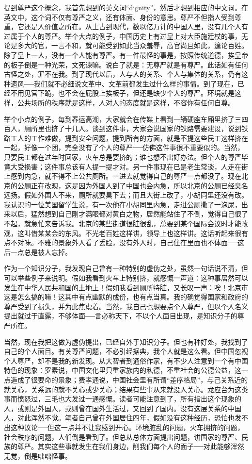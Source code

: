 提到尊严这个概念，我首先想到的英文词“dignity”，然后才想到相应的中文词。在英文中，这个词不仅有尊严之义，还有体面、身份的意思。尊严不但指人受到尊重，它还是人价值之所在。从上古到现代，数以亿万计的中国人里，没有几个人有过属于个人的尊严。举个大点的例子，中国历史上有过皇上对大臣施廷杖的事，无论是多大的官，一言不和，就可能受到如此当众羞辱，高官尚且如此，遑论百姓。除了皇上一人，没有一个人能有尊严。有一件最怪的事是，按照传统道德，挨皇帝的板子倒是一种光荣，文死谏嘛。说白了就是：无尊严就是有尊严。此话如有任何古怪之处，罪不在我。到了现代以后，人与人的关系、个人与集体的关系，仍有这种遗风──我们就不必细说文革中、文革前都发生过什么样的事情。到了现在，已经不用见官下跪，也不会在屁股上挨板子，但还是缺少个人的尊严。环境就是这样，公共场所的秩序就是这样，人对人的态度就是这样，不容你有任何自尊。 

举个小点的例子，每到春运高潮，大家就会在传媒上看到一辆硬座车厢里挤了三四百人，厕所里也挤了十几人。谈到这件事，大家会说国家的铁路需要建设，说到铁路工人的工作难做，提到安全问题，提到所有的方面，就是不提这些民工这样挤在一起，好像一个团，完全没有了个人的尊严──仿佛这件事很不重要似的。当然，只要民工都在过年时回家，火车总是要挤的；谁也想不出好办法。但个人的尊严毕竟大受损害；这件事总该有人提一提才对。另一件事现在已是老生常谈，人走在街上感到内急，就不得不上公共厕所。一进去就觉得自己的尊严一点都没了。现在北京的公厕正在改观，这是因为外国人到了中国也会内急，所以北京的公厕已经臭名远扬。假如外国人不来，厕所就要臭下去；而且大街上改了，小胡同里还没有改。我认识的一位美国留学生说，有一次他在小胡同里内急，走进公厕撒了一泡尿，出来以后，猛然想到自己刚才满眼都对黄白之物，居然能站住了不倒，觉得自己很了不起，就急忙来告诉我。北京的某些街道很脏很乱，总要到某个国际会议时才能改观，这叫借某某会的东风。不光老百姓这样讲，领导上也这样讲。这话听起来很有点不对味。不雅的景象外人看了丢脸，没有外人时，自己住在里面也不体面──这后一点总是被人忘掉。 

作为一个知识分子，我发现自己曾有一种特别的虚伪之处，虽然一句话说不清，但可以举些例子来说明。假如我看到火车上特别挤，就感慨一声道：这种事居然可以发生在中华人民共和国的土地上！假如我看到厕所特脏，又长叹一声：唉！北京市这是怎么搞的嘛！这其中有点幽默的成份，也有点当真。我的确觉得国家和政府的尊严受到了损失，并为此焦虑着。当然，我自己也想要点个人尊严，但以个人名义提出就过于直露，不够体面──言必称天下，不以个人面目出现，是知识分子的尊严所在。 

当然，现在我把这做为虚伪提出，已经自外于知识分子。但也有种好处，我找到了自己的个人面目。有关尊严问题，不必引经据典，我个人就是这么看。但中国忽视个人尊严，却不是我的新发现。从大智者到通俗作家，有不少人注意到一个有中国特色的现象：罗素说，中国文化里只重家族内的私德，不重社会的公德公益，这一点造成了很要命的景象；费孝通说，中国社会里有所谓“差序格局”，与己关系近的就关心，关系远的就不关心或少关心；结果有些事从来就没人关心。龙应台为这类事而愤怒过，三毛也大发过一通感慨。读者可能注意到了，所有指出这个现象的人，或则是外国人，或则曾在国外生活过，又回到了国内。没有这层关系的中国人，对此浑然不觉。笔者自己曾在外国居住四年，假如没有这种经历，恐怕也发不出这种议论──但这一点并不让我感到开心。环境脏乱的问题，火车拥挤的问题，社会秩序的问题，人们倒是看到了。但总从总体方面提出问题，讲国家的尊严、民族的尊严。其实这些事就发生在我们身边，削我们每个人的面子──对此能够浑然无觉，倒是咄咄怪事。 

